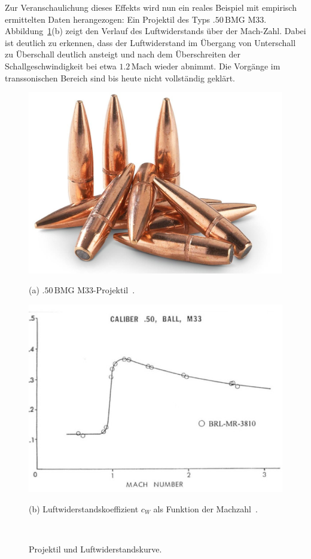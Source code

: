 Zur Veranschaulichung dieses Effekts wird nun ein reales Beispiel 
mit empirisch ermittelten Daten herangezogen:
Ein Projektil des Typs $.50\,\text{BMG}$ M33.
Abbildung~\ref{fig:luftwiderstand_50-M33}(b) zeigt den Verlauf
des Luftwiderstands über der Mach-Zahl.
Dabei ist deutlich zu erkennen, dass der Luftwiderstand 
im Übergang von Unterschall zu Überschall 
deutlich ansteigt und nach dem Überschreiten der 
Schallgeschwindigkeit bei etwa $1.2\,\text{Mach}$ 
wieder abnimmt.
Die Vorgänge im transsonischen Bereich sind bis heute 
nicht vollständig geklärt.
\begin{figure}
    \centering
    \begin{minipage}[t]{0.4\textwidth}
        \centering
        \includegraphics[width=\linewidth]{papers/ueberschall/figures/50-cal_projectile.jpg}
        \caption*{(a) $.50\,\text{BMG}$ M33-Projektil~\cite{ArmoryFarm50BMG}.}
    \end{minipage}
    \hfill
    \begin{minipage}[t]{0.55\textwidth}
        \centering
        \includegraphics[width=\linewidth]{papers/ueberschall/figures/50-M33 Geschoss.jpg}
        \caption*{(b) Luftwiderstandskoeffizient $c_W$ als Funktion der Machzahl~\cite{Mittelkaliber2020}.}
    \end{minipage}
    \caption{Projektil und Luftwiderstandskurve.}
    ~\label{fig:luftwiderstand_50-M33}
\end{figure}

